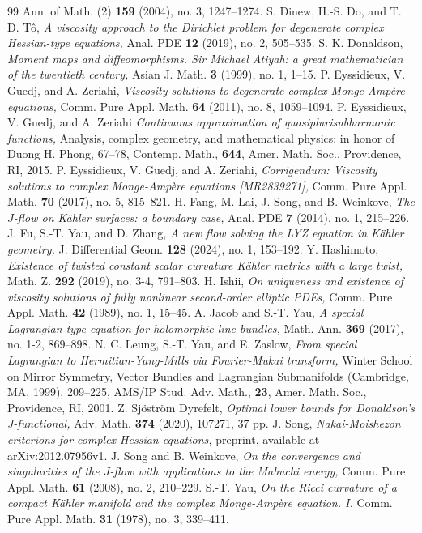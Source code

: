 \documentclass{amsart}
\numberwithin{equation}{section}
\theoremstyle{plain}
\theoremstyle{definition}
\theoremstyle{remark}
\begin{document}
\begin{thebibliography}{99}
  Ann. of Math. (2) \textbf{159} (2004), no. 3, 1247--1274. 
  S. Dinew, H.-S. Do, and T. D. T{\^o}, 
  \textit{A viscosity approach to the Dirichlet problem for degenerate complex Hessian-type equations,}
  Anal. PDE \textbf{12} (2019), no. 2, 505--535.
  S. K. Donaldson, 
  \textit{Moment maps and diffeomorphisms. Sir Michael Atiyah: a great mathematician of the twentieth century,} 
  Asian J. Math. \textbf{3} (1999), no. 1, 1--15.  
  P. Eyssidieux, V. Guedj, and A. Zeriahi, 
  \textit{Viscosity solutions to degenerate complex Monge-Amp{\`e}re equations,} 
  Comm. Pure Appl. Math. \textbf{64} (2011), no. 8, 1059--1094. 
  P. Eyssidieux, V. Guedj, and A. Zeriahi 
  \textit{Continuous approximation of quasiplurisubharmonic functions,}
  Analysis, complex geometry, and mathematical physics: in honor of Duong H. Phong, 67--78, Contemp. Math., \textbf{644}, Amer. Math. Soc., Providence, RI, 2015.
  P. Eyssidieux, V. Guedj, and A. Zeriahi, 
  \textit{Corrigendum: Viscosity solutions to complex Monge-Ampère equations [MR2839271],} 
  Comm. Pure Appl. Math. \textbf{70} (2017), no. 5, 815--821.
  H. Fang, M. Lai, J. Song, and B. Weinkove,
  \textit{The $J$-flow on Kähler surfaces: a boundary case,}
  Anal. PDE \textbf{7} (2014), no. 1, 215--226.
  J. Fu, S.-T. Yau, and D. Zhang, 
  \textit{A new flow solving the LYZ equation in Kähler geometry,} 
  J. Differential Geom. \textbf{128} (2024), no. 1, 153--192.
  Y. Hashimoto,
  \textit{Existence of twisted constant scalar curvature K{\"a}hler metrics with a large twist,}
  Math. Z. \textbf{292} (2019), no. 3-4, 791--803.
  H. Ishii, 
  \textit{On uniqueness and existence of viscosity solutions of fully nonlinear second-order elliptic PDEs,} 
  Comm. Pure Appl. Math. \textbf{42} (1989), no. 1, 15--45.
  A. Jacob and S.-T. Yau, 
  \textit{A special Lagrangian type equation for holomorphic line bundles,} Math. Ann. \textbf{369} (2017), no. 1-2, 869--898.
  N. C. Leung, S.-T. Yau, and E. Zaslow, 
  \textit{From special Lagrangian to Hermitian-Yang-Mills via Fourier-Mukai transform,} 
  Winter School on Mirror Symmetry, Vector Bundles and Lagrangian Submanifolds (Cambridge, MA, 1999), 209--225, AMS/IP Stud. Adv. Math., \textbf{23}, Amer. Math. Soc., Providence, RI, 2001. 
  Z. Sj{\"o}str{\"o}m Dyrefelt,
  \textit{Optimal lower bounds for Donaldson's J-functional,}
  Adv. Math. \textbf{374} (2020), 107271, 37 pp.  
  J. Song,
  \textit{Nakai-Moishezon criterions for complex Hessian equations,}
  preprint, available at arXiv:2012.07956v1.
  J. Song and B. Weinkove, 
  \textit{On the convergence and singularities of the $J$-flow with applications to the Mabuchi energy,} 
  Comm. Pure Appl. Math. \textbf{61} (2008), no. 2, 210--229. 
  S.-T. Yau, 
  \textit{On the Ricci curvature of a compact Kähler manifold and the complex Monge-Ampère equation. I.} 
  Comm. Pure Appl. Math. \textbf{31} (1978), no. 3, 339--411.
\end{thebibliography}
\end{document}
